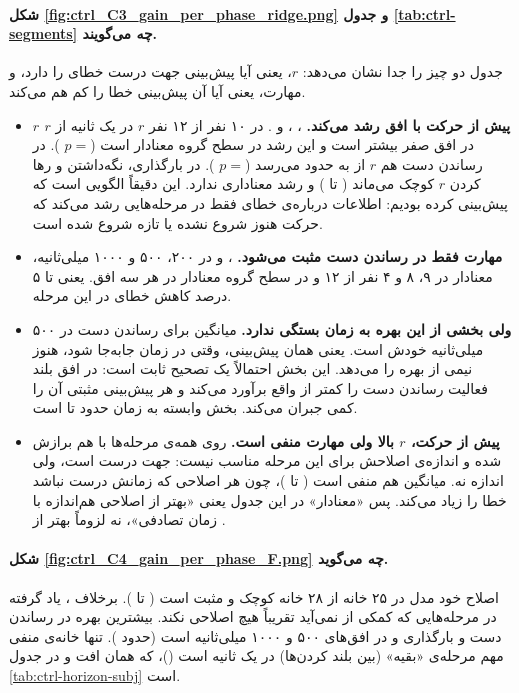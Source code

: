 \paragraph{شکل \ref{fig:ctrl_C3_gain_per_phase_ridge.png} و جدول \ref{tab:ctrl-segments} چه می‌گویند.} جدول دو چیز را جدا نشان می‌دهد: $r$، یعنی آیا پیش‌بینی  جهت درست خطای  را دارد، و مهارت، یعنی آیا آن پیش‌بینی خطا را کم هم می‌کند.
\begin{itemize}
\item \textbf{$r$ پیش از حرکت با افق رشد می‌کند.} ، ،  و . در ۱۰ نفر از ۱۲ نفر $r$ در یک ثانیه از $r$ در افق صفر بیشتر است و این رشد در سطح گروه معنادار است ($p=$ ). در رساندن دست هم $r$ از  به حدود  می‌رسد ($p=$ ). در بارگذاری، نگه‌داشتن و رها کردن $r$ کوچک می‌ماند ( تا ) و رشد معناداری ندارد. این دقیقاً الگویی است که پیش‌بینی کرده بودیم: اطلاعات  درباره‌ی خطای  فقط در مرحله‌هایی رشد می‌کند که حرکت هنوز شروع نشده یا تازه شروع شده است.
\item \textbf{مهارت فقط در رساندن دست مثبت می‌شود.} ،  و  در ۲۰۰، ۵۰۰ و ۱۰۰۰ میلی‌ثانیه، معنادار در ۹، ۸ و ۴ نفر از ۱۲ و در سطح گروه معنادار در هر سه افق. یعنی تا ۵ درصد کاهش خطای  در این مرحله.
\item \textbf{ولی بخشی از این بهره به زمان بستگی ندارد.} میانگین  برای رساندن دست در ۵۰۰ میلی‌ثانیه خودش  است. یعنی همان پیش‌بینی، وقتی در زمان جابه‌جا شود، هنوز نیمی از بهره را می‌دهد. این بخش احتمالاً یک تصحیح ثابت است:  در افق بلند فعالیت رساندن دست را کمتر از واقع برآورد می‌کند و هر پیش‌بینی مثبتی آن را کمی جبران می‌کند. بخش وابسته به زمان حدود  تا  است.
\item \textbf{پیش از حرکت، $r$ بالا ولی مهارت منفی است.}  روی همه‌ی مرحله‌ها با هم برازش شده و اندازه‌ی اصلاحش برای این مرحله مناسب نیست: جهت درست است، ولی اندازه نه. میانگین  هم منفی است ( تا )، چون هر اصلاحی که زمانش درست نباشد خطا را زیاد می‌کند. پس «معنادار» در این جدول یعنی «بهتر از اصلاحی هم‌اندازه با زمان تصادفی»، نه لزوماً بهتر از .
\end{itemize}


\paragraph{شکل \ref{fig:ctrl_C4_gain_per_phase_F.png} چه می‌گوید.} اصلاح خود مدل در ۲۵ خانه از ۲۸ خانه کوچک و مثبت است ( تا ). برخلاف ،  یاد گرفته در مرحله‌هایی که کمکی از  نمی‌آید تقریباً هیچ اصلاحی نکند. بیشترین بهره در رساندن دست و بارگذاری و در افق‌های ۵۰۰ و ۱۰۰۰ میلی‌ثانیه است (حدود ). تنها خانه‌ی منفی مهم مرحله‌ی «بقیه» (بین بلند کردن‌ها) در یک ثانیه است ()، که همان افت  و  در جدول \ref{tab:ctrl-horizon-subj} است.

